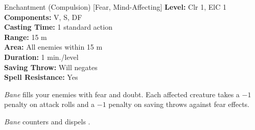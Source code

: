 {Enchantment (Compulsion) [Fear, Mind-Affecting]}
{
	\textbf{Level:}
	Clr 1, ElC 1\\
	\textbf{Components:}
	V, S, DF\\
	\textbf{Casting Time:}
	1 standard action\\
	\textbf{Range:}
	15 m\\
	\textbf{Area:}
	All enemies within 15 m\\
	\textbf{Duration:}
	1 min./level\\
	\textbf{Saving Throw:}
	Will negates\\
	\textbf{Spell Resistance:}
	Yes\\
}
{
	\emph{Bane} fills your enemies with fear and doubt. Each affected creature takes a $-1$ penalty on attack rolls and a $-1$ penalty on saving throws against fear effects.

	\emph{Bane} counters and dispels .

}
